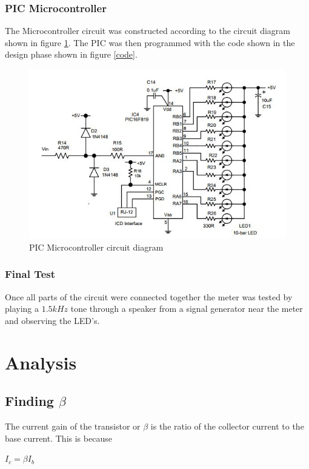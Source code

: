 \documentclass[10pt,a4paper]{article}
\begin{document}
\subsubsection{PIC Microcontroller}
The Microcontroller circuit was constructed according to the circuit diagram shown in figure \ref{PIC}. The PIC was then programmed with the code shown in the design phase shown in figure \ref{code}.

\begin{figure}[!h]
\includegraphics[width = \textwidth]{PIC}
\caption{PIC Microcontroller circuit diagram}
\label{PIC}
\end{figure} 

\subsubsection{Final Test}
Once all parts of the circuit were connected together the meter was tested by playing a $1.5kHz$ tone through a speaker from a signal generator near the meter and observing the LED's.






\newpage
\section{Analysis}
\newpage
\subsection{Finding $\beta$}
The current gain of the transistor or $\beta$ is the ratio of the collector current to the base current. This is because 
\begin{center}
\Huge
$I_c = \beta I_b$
\end{center}
\end{document}
